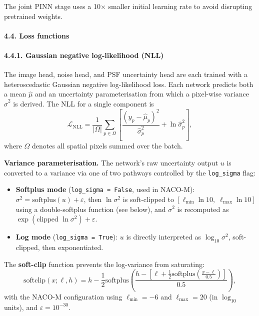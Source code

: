 \documentclass{aa}
\begin{document}
The joint PINN stage uses a 10$\times$ smaller initial learning rate to avoid disrupting pretrained weights.

\paragraph{4.4. Loss functions}

\paragraph{4.4.1. Gaussian negative log-likelihood (NLL)}

The image head, noise head, and PSF uncertainty head are each trained with a heteroscedastic Gaussian negative log-likelihood loss. Each network predicts both a mean $\hat{\mu}$ and an uncertainty parameterisation from which a pixel-wise variance $\hat{\sigma}^2$ is derived. The NLL for a single component is
\begin{equation}
\mathcal{L}_{\mathrm{NLL}} =
\frac{1}{|\Omega|}\sum_{p \in \Omega}
\left[
\frac{(y_p - \hat{\mu}_p)^2}{\hat{\sigma}_p^2}
+ \ln \hat{\sigma}_p^2
\right],
\end{equation}
where $\Omega$ denotes all spatial pixels summed over the batch.

\textbf{Variance parameterisation.} The network's raw uncertainty output $u$ is converted to a variance via one of two pathways controlled by the \texttt{log\_sigma} flag:
\begin{itemize}
    \item \textbf{Softplus mode} (\texttt{log\_sigma = False}, used in NACO-M): $\sigma^2 = \mathrm{softplus}(u) + \varepsilon$, then $\ln \sigma^2$ is soft-clipped to $[\ell_{\min}\ln 10,\; \ell_{\max}\ln 10]$ using a double-softplus function (see below), and $\sigma^2$ is recomputed as $\exp(\text{clipped } \ln \sigma^2) + \varepsilon$.
    \item \textbf{Log mode} (\texttt{log\_sigma = True}): $u$ is directly interpreted as $\log_{10}\sigma^2$, soft-clipped, then exponentiated.
\end{itemize}

The \textbf{soft-clip} function prevents the log-variance from saturating:
\begin{equation}
\mathrm{softclip}(x; \ell, h)
=
h - \frac{1}{2}\mathrm{softplus}\!\left(
\frac{
h - \left[
\ell + \frac{1}{2}\mathrm{softplus}\!\left(\frac{x - \ell}{0.5}\right)
\right]
}{0.5}
\right),
\end{equation}
with the NACO-M configuration using $\ell_{\min} = -6$ and $\ell_{\max} = 20$ (in $\log_{10}$ units), and $\varepsilon = 10^{-30}$.
\end{document}
